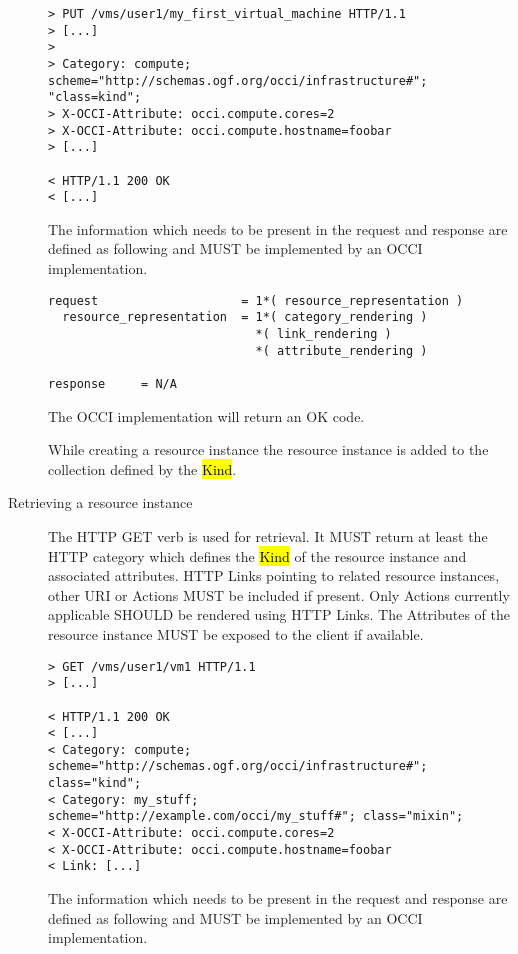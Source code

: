 \documentclass[10pt,a4paper]{article}
\begin{document}
\begin{description}
\begin{verbatim}
> PUT /vms/user1/my_first_virtual_machine HTTP/1.1
> [...]
> 
> Category: compute; scheme="http://schemas.ogf.org/occi/infrastructure#"; "class=kind"; 
> X-OCCI-Attribute: occi.compute.cores=2
> X-OCCI-Attribute: occi.compute.hostname=foobar
> [...]
 
< HTTP/1.1 200 OK
< [...]
\end{verbatim}

    The information which needs to be present in the request and
    response are defined as following and MUST be implemented by an
    OCCI implementation.

\begin{verbatim}
request                    = 1*( resource_representation )
  resource_representation  = 1*( category_rendering )
                             *( link_rendering )
                             *( attribute_rendering )

response     = N/A
\end{verbatim}

    The OCCI implementation will return an OK code.
  
    While creating a resource instance the resource instance is added
    to the collection defined by the \hl{Kind}.

  \item[Retrieving a resource instance] The HTTP GET
    verb is used for retrieval. It MUST return at least the HTTP category which
    defines the \hl{Kind} of the resource instance and associated attributes. HTTP Links
    pointing to related resource instances, other URI or Actions MUST
    be included if present. Only Actions currently applicable SHOULD
    be rendered using HTTP Links. The Attributes of the resource
    instance MUST be exposed to the client if available.

\begin{verbatim}
> GET /vms/user1/vm1 HTTP/1.1
> [...]
 
< HTTP/1.1 200 OK
< [...]
< Category: compute; scheme="http://schemas.ogf.org/occi/infrastructure#"; class="kind";
< Category: my_stuff; scheme="http://example.com/occi/my_stuff#"; class="mixin";
< X-OCCI-Attribute: occi.compute.cores=2
< X-OCCI-Attribute: occi.compute.hostname=foobar
< Link: [...]
\end{verbatim}

    The information which needs to be present in the request and
    response are defined as following and MUST be implemented by an
    OCCI implementation.


\end{description}
\end{document}
